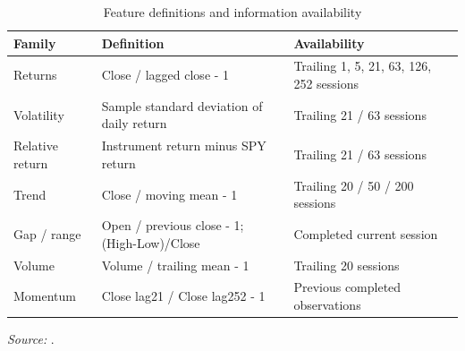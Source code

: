 \begin{table}[!htbp]\centering\footnotesize\setlength{\tabcolsep}{3pt}\renewcommand{\arraystretch}{1.14}
\caption{Feature definitions and information availability}\label{tab:2}
\begin{tabular}{@{}>{\raggedright\arraybackslash}p{}>{\raggedright\arraybackslash}p{}>{\raggedright\arraybackslash}p{}@{}}
\toprule
\textbf{Family} & \textbf{Definition} & \textbf{Availability} \\
\midrule
Returns & Close /\allowbreak{} lagged close - 1 & Trailing 1, 5, 21, 63, 126, 252 sessions \\
Volatility & Sample standard deviation of daily return & Trailing 21 /\allowbreak{} 63 sessions \\
Relative return & Instrument return minus SPY return & Trailing 21 /\allowbreak{} 63 sessions \\
Trend & Close /\allowbreak{} moving mean - 1 & Trailing 20 /\allowbreak{} 50 /\allowbreak{} 200 sessions \\
Gap /\allowbreak{} range & Open /\allowbreak{} previous close - 1; (High-Low)/\allowbreak{}Close & Completed current session \\
Volume & Volume /\allowbreak{} trailing mean - 1 & Trailing 20 sessions \\
Momentum & Close lag21 /\allowbreak{} Close lag252 - 1 & Previous completed observations \\
\bottomrule\end{tabular}\par\smallskip
\raggedright\textit{Source:} .
\end{table}
